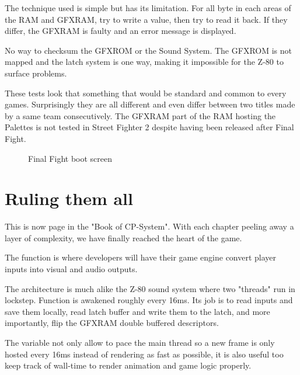 \pagebreak


The technique used is simple but has its limitation. For all byte in each areas of the RAM and GFXRAM, try to write a value, then try to read it back. If they differ, the GFXRAM is faulty and an error message is displayed. 

\begin{trivia}
No way to checksum the GFXROM or the Sound System. The GFXROM is not mapped and the latch system is one way, making it impossible for the Z-80 to surface problems.
\end{trivia}

These tests look that something that would be standard and common to every games. Surprisingly they are all different and even differ between two titles made by a same team consecutively. The GFXRAM part of the RAM hosting the Palettes is not tested in Street Fighter 2 despite having been released after Final Fight.


\vfill
\begin{figure}[H]
\caption*{Final Fight boot screen}
\end{figure}






\section{Ruling them all}
\label{this}
This is now \pageref{this} page in the "Book of CP-System". With each chapter peeling away a layer of complexity, we have finally reached the heart of the game. 

The function  is where developers will have their game engine convert player inputs into visual and audio outputs.

The architecture is much alike the Z-80 sound system where two "threads" run in lockstep. Function  is awakened roughly every 16ms. Its job is to read inputs and save them locally, read latch buffer and write them to the latch, and more importantly, flip the GFXRAM double buffered descriptors. 

\begin{trivia}
The  variable not only allow to pace the main thread so a new frame is only hosted every 16ms instead of rendering as fast as possible, it is also useful too keep track of wall-time to render animation and game logic properly.
\end{trivia}


